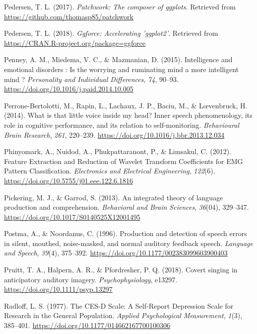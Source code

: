 \documentclass[a4paper,12pt,twoside,openright,oldfontcommands]{memoir}
\begin{document}
\leavevmode\hypertarget{ref-R-patchwork}{}%
Pedersen, T. L. (2017). \emph{Patchwork: The composer of ggplots}. Retrieved from \url{https://github.com/thomasp85/patchwork}

\leavevmode\hypertarget{ref-R-ggforce}{}%
Pedersen, T. L. (2018). \emph{Ggforce: Accelerating 'ggplot2'}. Retrieved from \url{https://CRAN.R-project.org/package=ggforce}

\leavevmode\hypertarget{ref-Penney2015}{}%
Penney, A. M., Miedema, V. C., \& Mazmanian, D. (2015). Intelligence and emotional disorders : Is the worrying and ruminating mind a more intelligent mind ? \emph{Personality and Individual Differences}, \emph{74}, 90--93. \url{https://doi.org/10.1016/j.paid.2014.10.005}

\leavevmode\hypertarget{ref-Perrone-Bertolotti2014}{}%
Perrone-Bertolotti, M., Rapin, L., Lachaux, J. P., Baciu, M., \& Lœvenbruck, H. (2014). What is that little voice inside my head? Inner speech phenomenology, its role in cognitive performance, and its relation to self-monitoring. \emph{Behavioural Brain Research}, \emph{261}, 220--239. \url{https://doi.org/10.1016/j.bbr.2013.12.034}

\leavevmode\hypertarget{ref-phinyomark_feature_2012}{}%
Phinyomark, A., Nuidod, A., Phukpattaranont, P., \& Limsakul, C. (2012). Feature Extraction and Reduction of Wavelet Transform Coefficients for EMG Pattern Classification. \emph{Electronics and Electrical Engineering}, \emph{122}(6). \url{https://doi.org/10.5755/j01.eee.122.6.1816}

\leavevmode\hypertarget{ref-pickering_integrated_2013}{}%
Pickering, M. J., \& Garrod, S. (2013). An integrated theory of language production and comprehension. \emph{Behavioral and Brain Sciences}, \emph{36}(04), 329--347. \url{https://doi.org/10.1017/S0140525X12001495}

\leavevmode\hypertarget{ref-postma_production_1996}{}%
Postma, A., \& Noordanus, C. (1996). Production and detection of speech errors in silent, mouthed, noise-masked, and normal auditory feedback speech. \emph{Language and Speech}, \emph{39}(4), 375--392. \url{https://doi.org/10.1177/002383099603900403}

\leavevmode\hypertarget{ref-pruitt_covert_2018}{}%
Pruitt, T. A., Halpern, A. R., \& Pfordresher, P. Q. (2018). Covert singing in anticipatory auditory imagery. \emph{Psychophysiology}, e13297. \url{https://doi.org/10.1111/psyp.13297}

\leavevmode\hypertarget{ref-radloff_ces-d_1977}{}%
Radloff, L. S. (1977). The CES-D Scale: A Self-Report Depression Scale for Research in the General Population. \emph{Applied Psychological Measurement}, \emph{1}(3), 385--401. \url{https://doi.org/10.1177/014662167700100306}
\end{document}
